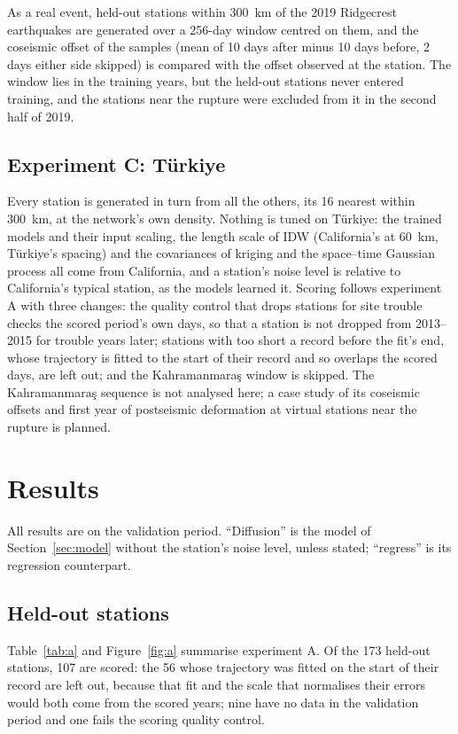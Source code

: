 \documentclass[preprint,12pt,authoryear]{elsarticle}
\begin{document}
As a real event, held-out stations within 300~km of the 2019 Ridgecrest earthquakes are
generated over a 256-day window centred on them, and the coseismic offset of the samples
(mean of 10 days after minus 10 days before, 2 days either side skipped) is compared with
the offset observed at the station. The window lies in the training years, but the
held-out stations never entered training, and the stations near the rupture were excluded
from it in the second half of 2019.

\subsection{Experiment C: T\"urkiye}

Every station is generated in turn from all the others, its 16 nearest within 300~km, at
the network's own density. Nothing is tuned on T\"urkiye: the trained models and their
input scaling, the length scale of IDW (California's at 60~km, T\"urkiye's spacing) and
the covariances of kriging and the space--time Gaussian process all come from California,
and a station's noise level is relative to California's typical station, as the models
learned it. Scoring follows experiment A with three changes: the quality control that
drops stations for site trouble checks the scored period's own days, so that a station is
not dropped from 2013--2015 for trouble years later; stations with too short a record
before the fit's end, whose trajectory is fitted to the start of their record and so
overlaps the scored days, are left out; and the Kahramanmara\c{s} window is skipped. The
Kahramanmara\c{s} sequence is not analysed here; a case study of its coseismic offsets
and first year of postseismic deformation at virtual stations near the rupture is planned.

\section{Results}
\label{sec:results}

All results are on the validation period. ``Diffusion'' is the model of
Section~\ref{sec:model} without the station's noise level, unless stated; ``regress'' is
its regression counterpart.

\FloatBarrier
\subsection{Held-out stations}
\label{sec:resultsa}

Table~\ref{tab:a} and Figure~\ref{fig:a} summarise experiment A. Of the 173 held-out
stations, 107 are scored: the 56 whose trajectory was fitted on the start of their record
are left out, because that fit and the scale that normalises their errors would both come
from the scored years; nine have no data in the validation period and one fails the
scoring quality control.
\end{document}
